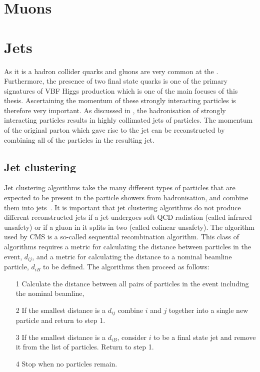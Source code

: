 \section{Muons}
\label{sec:muons}

\section{Jets}
\label{sec:jets}
As it is a hadron collider quarks and gluons are very common at the \LHC. Furthermore, the presence of two final state quarks is one of the primary signatures of \ac{VBF} Higgs production which is one of the main focuses of this thesis. Ascertaining the momentum of these strongly interacting particles is therefore very important. As discussed in , the hadronisation of strongly interacting particles results in highly collimated jets of particles. The momentum of the original parton which gave rise to the jet can be reconstructed by combining all of the particles in the resulting jet.


\subsection{Jet clustering}
Jet clustering algorithms take the many different types of particles that are expected to be present in the particle showers from hadronisation, and combine them into jets~\cite{Salam:2009jx}. It is important that jet clustering algorithms do not produce different reconstructed jets if a jet undergoes soft QCD radiation (called infrared unsafety) or if a gluon in it splits in two (called colinear unsafety). The algorithm used by CMS is a so-called sequential recombination algorithm. This class of algorithms requires a metric for calculating the distance between particles in the event, $d_{ij}$, and a metric for calculating the distance to a nominal beamline particle, $d_{iB}$ to be defined. The algorithms then proceed as follows:
\begin{itemize}
\item[1] Calculate the distance between all pairs of particles in the event including the nominal beamline,
\item[2] If the smallest distance is a $d_{ij}$ combine $i$ and $j$ together into a single new particle and return to step 1.
\item[3] If the smallest distance is a $d_{iB}$, consider $i$ to be a final state jet and remove it from the list of particles. Return to step 1.
\item[4] Stop when no particles remain.
\end{itemize}

